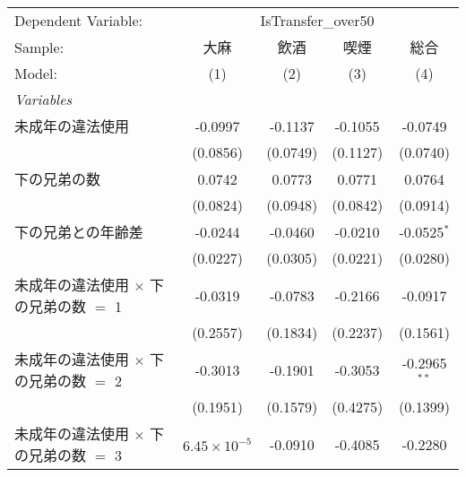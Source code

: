 \documentclass{article}
\begin{document}
\begin{landscape}


\begingroup
\centering
\begin{threeparttable}[b]
   \begin{tabular}{lcccc}
      \tabularnewline \midrule \midrule
      Dependent Variable: & \multicolumn{4}{c}{IsTransfer\_over50}\\
      Sample:                                       & 大麻                  & 飲酒         & 喫煙          & 総合 \\   
      Model:                                        & (1)                   & (2)          & (3)           & (4)\\  
      \midrule
      \emph{Variables}\\
      未成年の違法使用                              & -0.0997               & -0.1137      & -0.1055       & -0.0749\\   
                                                    & (0.0856)              & (0.0749)     & (0.1127)      & (0.0740)\\   
      下の兄弟の数                                  & 0.0742                & 0.0773       & 0.0771        & 0.0764\\   
                                                    & (0.0824)              & (0.0948)     & (0.0842)      & (0.0914)\\   
      下の兄弟との年齢差                            & -0.0244               & -0.0460      & -0.0210       & -0.0525$^{*}$\\   
                                                    & (0.0227)              & (0.0305)     & (0.0221)      & (0.0280)\\   
      未成年の違法使用 $\times$ 下の兄弟の数 $=$ 1  & -0.0319               & -0.0783      & -0.2166       & -0.0917\\   
                                                    & (0.2557)              & (0.1834)     & (0.2237)      & (0.1561)\\   
      未成年の違法使用 $\times$ 下の兄弟の数 $=$ 2  & -0.3013               & -0.1901      & -0.3053       & -0.2965$^{**}$\\   
                                                    & (0.1951)              & (0.1579)     & (0.4275)      & (0.1399)\\   
      未成年の違法使用 $\times$ 下の兄弟の数 $=$ 3  & $6.45\times 10^{-5}$  & -0.0910      & -0.4085       & -0.2280\\   

\end{tabular}
\end{threeparttable}
\end{landscape}
\end{document}
